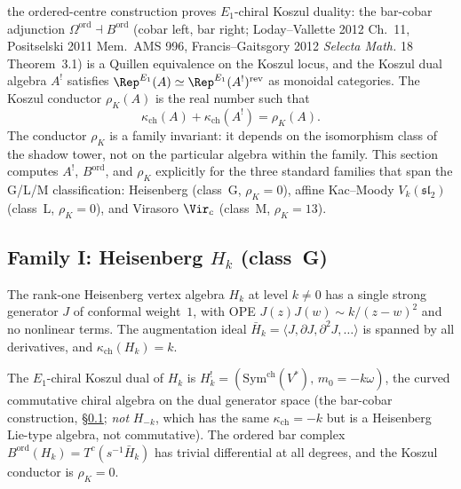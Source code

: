 the ordered-centre construction proves $E_1$-chiral Koszul duality: the bar-cobar adjunction
$\Omega^{\mathrm{ord}} \dashv B^{\mathrm{ord}}$ (cobar left, bar right; Loday--Vallette 2012 Ch.~11, Positselski 2011 Mem.\ AMS 996, Francis--Gaitsgory 2012 \emph{Selecta Math.} 18 Theorem~3.1) is a Quillen equivalence
on the Koszul locus, and the Koszul dual algebra $A^!$ satisfies
$\Rep^{E_1}(A) \simeq \Rep^{E_1}(A^!)^{\mathrm{rev}}$ as monoidal
categories. The Koszul conductor $\rho_K(A)$ is the real number such that
\begin{equation}\label{eq:koszul-conductor}
 \kappa_{\mathrm{ch}}(A) + \kappa_{\mathrm{ch}}(A^!) = \rho_K(A).
\end{equation}
The conductor $\rho_K$ is a family invariant: it depends on the
isomorphism class of the shadow tower, not on the particular algebra
within the family. This section computes $A^!$, $B^{\mathrm{ord}}$, and
$\rho_K$ explicitly for the three standard families that span the G/L/M
classification: Heisenberg (class~G, $\rho_K = 0$), affine Kac--Moody
$V_k(\mathfrak{sl}_2)$ (class~L, $\rho_K = 0$), and Virasoro $\Vir_c$
(class~M, $\rho_K = 13$).

\subsection{Family I: Heisenberg \texorpdfstring{$H_k$}{H-k} (class~G)}
\label{subsec:koszul-heisenberg}

The rank-one Heisenberg vertex algebra $H_k$ at level $k \neq 0$ has a
single strong generator $J$ of conformal weight~$1$, with OPE
$J(z)J(w) \sim k/(z-w)^2$ and no nonlinear terms. The augmentation ideal
$\bar{H}_k = \langle J, \partial J, \partial^2 J, \ldots \rangle$ is
spanned by all derivatives, and $\kappa_{\mathrm{ch}}(H_k) = k$.

\begin{proposition}
\label{prop:koszul-heisenberg}
The $E_1$-chiral Koszul dual of $H_k$ is
$H_k^! = (\mathrm{Sym}^{\mathrm{ch}}(V^*),\, m_0 = -k\omega)$,
the curved commutative chiral algebra on the dual generator space
(the bar-cobar construction, \S\ref{subsec:koszul-heisenberg};
\emph{not} $H_{-k}$, which has the same $\kappa_{\mathrm{ch}} = -k$
but is a Heisenberg Lie-type algebra, not commutative).
The ordered bar complex
$B^{\mathrm{ord}}(H_k) = T^c(s^{-1}\bar{H}_k)$ has trivial differential
at all degrees, and the Koszul conductor is $\rho_K = 0$.
\end{proposition}

